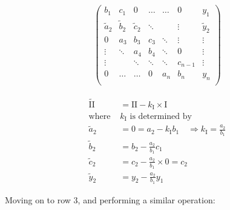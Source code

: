 \documentclass[11pt,a4paper,notitlepage]{article}
\begin{document}
\begin{minipage}{0.5\linewidth}
\begin{align*}
\left(\begin{matrix}
  b_1   & c_1    & 0      & \dots   & \dots  & 0       & y_1     \\
  \tilde{a}_2   & \tilde{b}_2    & \tilde{c}_2    & \ddots  &        & \vdots  & \tilde{y}_2  \\
  0     & a_3    & b_3    & c_3     & \ddots & \vdots  & \vdots  \\
 \vdots & \ddots & a_4    & b_4     & \ddots & 0       & \vdots  \\
 \vdots &        & \ddots & \ddots  & \ddots & c_{n-1}     & \vdots  \\
  0     & \dots  & \dots  & 0       & a_{n}  & b_n     & y_{n}   \\
\end{matrix}\right)
\end{align*}
\end{minipage}
\begin{minipage}{0.5\linewidth}
	\begin{align*}
	\tilde{\text{II}} &= \text{II} - k_\text{I} \times \text{I}\\
	\text{where }&k_\text{I} \text{ is determined by}\\
	\tilde{a}_2 &= 0 = a_2 - k_\text{I}b_1 \quad \Rightarrow k_\text{I} = \frac{a_2}{b_1}\\
	\tilde{b}_2 &= b_2 - \frac{a_2}{b_1} c_1 \\
	\tilde{c}_2 &= c_2 - \frac{a_2}{b_1} \times 0 = c_2 \\
	\tilde{y}_2 &= y_2 - \frac{a_2}{b_1} y_1
	\end{align*}
\end{minipage}
Moving on to row 3, and performing a similar operation:
\end{document}
